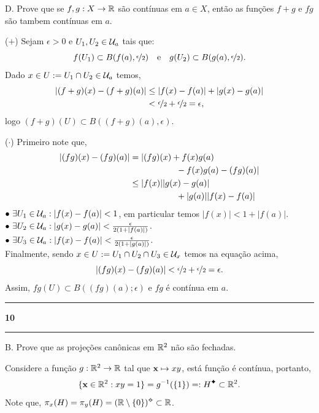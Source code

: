 D. Prove que se \(f,g : X \to \mathbb{R}\) são contínuas em \(a \in X\), então as funções \(f+g\) e \(fg\) são tambem contínuas em \(a\).  

\textcolor{gris}{(\(+\)) Sejam \(\epsilon > 0\) e \( U_1, U_2  \in \mathcal{U}_a\) tais que: 
\[f(U_1)\subset B(f(a), \nicefrac{\epsilon}{2}) \text{ \ \ e \ \ }g(U_2)\subset B(g(a), \nicefrac{\epsilon}{2}).\]
Dado \(x \in U:= U_1 \cap U_2 \in \mathcal{U}_a\) temos, 
\begin{align*}
  |(f+g)(x) - (f+g)(a)| &\leq  |f(x) -f(a)| + |g(x)-g(a)| \\ 
& < \nicefrac{\epsilon }{2} + \nicefrac{\epsilon }{2} = \epsilon, 
\end{align*}
logo \((f+g)(U) \subset B((f+g)(a), \epsilon)\).    
}

\textcolor{gris}{
(\(\cdot\)) Primeiro note que, 
\begin{align*}
  |(fg)(x) - (fg)(a)| &= |(fg)(x) + f(x)g(a) \\ 
  & \hspace{1.9cm} - f(x)g(a) - (fg)(a)|\\ 
  &\leq |f(x)||g(x)-g(a)| \\ 
  & \hspace{1.9cm}+ |g(a)||f(x)-f(a)| 
\end{align*} 
\(\bullet \ \exists U_1 \in \mathcal{U}_a : |f(x)-f(a)| < 1 \), em particular temos \(|f(x)| < 1 + |f(a)|\).  \\ 
\(\bullet \ \exists U_2 \in \mathcal{U}_a : |g(x)-g(a)| < \frac{\epsilon}{2(1 + |f(a)|)} \). \\ 
\(\bullet \ \exists U_3 \in \mathcal{U}_a : |f(x)-f(a)| < \frac{\epsilon}{2(1 + |g(a)|)} \). \vspace{0.3cm}\\ 
Finalmente, sendo \(x \in U := U_1 \cap U_2 \cap U_3 \in \mathcal{U}_x\) temos na equação acima, 
\[ |(fg)(x) - (fg)(a)| < \nicefrac{\epsilon}{2} + \nicefrac{\epsilon}{2} = \epsilon.\]
Assim, \(fg(U) \subset B((fg)(a);\epsilon)\) e \(fg\) é contínua em \(a\). 
}

\vspace{0.3cm}
  {\hrule \vspace{-0.15cm}
  \centering \textbf{10} \vspace{0.1cm}
  \hrule}

B. Prove que as projeções canônicas em \(\mathbb{R}^2\) não são fechadas. 

\textcolor{gris}{Considere a função \(g: \mathbb{R}^2 \to \mathbb{R} \) tal que \(\textbf{x} \mapsto xy\), está função é contínua, portanto, \[\{\x \in \R^2 : xy = 1\} = g^{-1}(\{1\}) =: H\ce \subset \R^2.\]  
Note que, \(\pi_x (H) = \pi_y(H) = (\R \setminus\{0\}) \ab \subset \R\).
}

